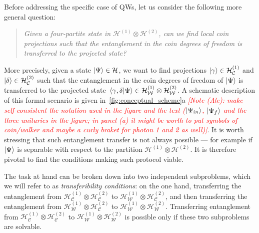 \documentclass[
	aps, pra,
	superscriptaddress, twocolumn,
	floatfix,
	10pt
]{revtex4-1}
\newcommand{\on}[1]{\operatorname{#1}}
\newcommand{\parTitle}[1]{\noindent{\color{Mahogany}(\emph{#1})}}
\newcommand{\calC}{{\mathcal{C}}}
\newcommand{\calH}{{\mathcal{H}}}
\newcommand{\calW}{{\mathcal{W}}}
\newcommand{\commale}[1]{{\textcolor{red} {\it{[Note (Ale): #1]}}}}
\renewcommand{\parTitle}[1]{}
\begin{document}
\parTitle{Problem statement}
Before addressing the specific case of QWs, let us consider the following more general question:
\begin{quote}
    \textit{Given a four-partite state in $\calH^{(1)}\otimes\calH^{(2)}$, can we find local coin projections such that the entanglement in the coin degrees of freedom is transferred to the projected state?}
\end{quote}%
More precisely, given a state $\ket\Psi\in\calH$, we want to find projections $\ket{\gamma}\in\calH^{(1)}_{\calC}$ and $\ket\delta\in\calH^{(2)}_{\calC}$ such that the entanglement in the coin degrees of freedom of $\ket\Psi$ is transferred to the projected state
$\braket*{\gamma,\delta}{\Psi}\in\calH^{(1)}_{\calW}\otimes\calH^{(2)}_{\calW}$.
A schematic description of this formal scenario is given in~\cref{fig:conceptual_scheme}a \commale{make self-consistent the notation used in the figure and the text ($\ket{\Psi_{in}}$, $\ket{\Psi_{f}}$ and the three unitaries in the figure; in panel (a) it might be worth to put symbols of coin/walker and maybe a curly braket for photon 1 and 2 as well)}.
It is worth stressing that such entanglement transfer is not always possible --- for example if $\ket\Psi$ is separable with respect to the partition $\calH^{(1)}\otimes\calH^{(2)}$. It is therefore pivotal to find the conditions making such protocol viable.


\parTitle{We are actually dealing with two problems at once}
The task at hand can be broken down into two independent subproblems, which we will refer to as \textit{transferibility conditions}: on the one hand, transferring the entanglement from $\calH^{(1)}_{\calC}\otimes \calH^{(2)}_{\calC}$ to $\calH^{(1)}_{\calW}\otimes \calH^{(2)}_{\calC}$,
and then transferring the entanglement from
$\calH^{(1)}_{\calW}\otimes \calH^{(2)}_{\calC}$
to $\calH^{(1)}_{\calW}\otimes \calH^{(2)}_{\calW}$.
Transferring entanglement from $\calH^{(1)}_{\calC}\otimes\calH^{(2)}_{\calC}$ to
$\calH^{(1)}_{\calW}\otimes\calH^{(2)}_{\calW}$ is possible only if these two subproblems are solvable.
\end{document}
